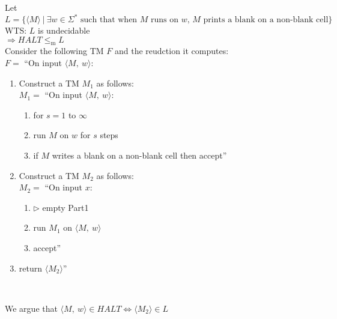\documentclass[preview]{standalone} %
\begin{document}
Let $L=\{\langle M\rangle\ |\ \exists w \in \Sigma^*
\text{ such that when $M$ runs on $w$, $M$ prints a blank on a non-blank cell}\}$\\

WTS: $L$ is undecidable\\
$\Longrightarrow HALT \leq_\text{m} L$\\

Consider the following TM $F$ and the reudction it computes:\\
$F=$ ``On input $\langle M,\ w\rangle$:
\begin{enumerate}[leftmargin=13mm, nosep, label=\textbf{\arabic*}.]
    \item Construct a TM $M_1$ as follows:\\
        $M_1 = $ ``On input $\langle M,\ w\rangle$:
        \begin{enumerate}[leftmargin=15mm, nosep, label=\textbf{\arabic*}.]
            \item for $s = 1$ to $\infty$
            \item \qquad run $M$ on $w$ for $s$ steps
            \item \qquad if $M$ writes a blank on a non-blank cell then accept''
        \end{enumerate}
    \item Construct a TM $M_2$ as follows:\\
        $M_2 = $ ``On input $x$:
        \begin{enumerate}[leftmargin=15mm, nosep, label=\textbf{\arabic*}.]
            \item $\rhd$ empty Part1
            \item run $M_1$ on $\langle M,\ w\rangle$
            \item accept''
        \end{enumerate}
    \item return $\langle M_2\rangle$''
\end{enumerate}~

We argue that $\langle M,\ w\rangle \in HALT \Longleftrightarrow \langle M_2\rangle \in L$\\
\end{document}
